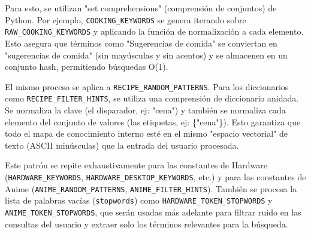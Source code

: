 \documentclass[letterpaper,12pt]{article}
\begin{document}
Para esto, se utilizan "set comprehensions" (comprensión de conjuntos) de Python. Por ejemplo, \texttt{COOKING\_KEYWORDS} se genera iterando sobre \texttt{RAW\_COOKING\_KEYWORDS} y aplicando la función de normalización a cada elemento. Esto asegura que términos como "Sugerencias de comida" se conviertan en "sugerencias de comida" (sin mayúsculas y sin acentos) y se almacenen en un conjunto hash, permitiendo búsquedas O(1).

El mismo proceso se aplica a \texttt{RECIPE\_RANDOM\_PATTERNS}. Para los diccionarios como \texttt{RECIPE\_FILTER\_HINTS}, se utiliza una comprensión de diccionario anidada. Se normaliza la clave (el disparador, ej: "cena") y también se normaliza cada elemento del conjunto de valores (las etiquetas, ej: \{"cena"\}). Esto garantiza que todo el mapa de conocimiento interno esté en el mismo "espacio vectorial" de texto (ASCII minúsculas) que la entrada del usuario procesada.

Este patrón se repite exhaustivamente para las constantes de Hardware (\texttt{HARDWARE\_KEYWORDS}, \texttt{HARDWARE\_DESKTOP\_KEYWORDS}, etc.) y para las constantes de Anime (\texttt{ANIME\_RANDOM\_PATTERNS}, \texttt{ANIME\_FILTER\_HINTS}). También se procesa la lista de palabras vacías (\texttt{stopwords}) como \texttt{HARDWARE\_TOKEN\_STOPWORDS} y \texttt{ANIME\_TOKEN\_STOPWORDS}, que serán usadas más adelante para filtrar ruido en las consultas del usuario y extraer solo los términos relevantes para la búsqueda.
\end{document}
